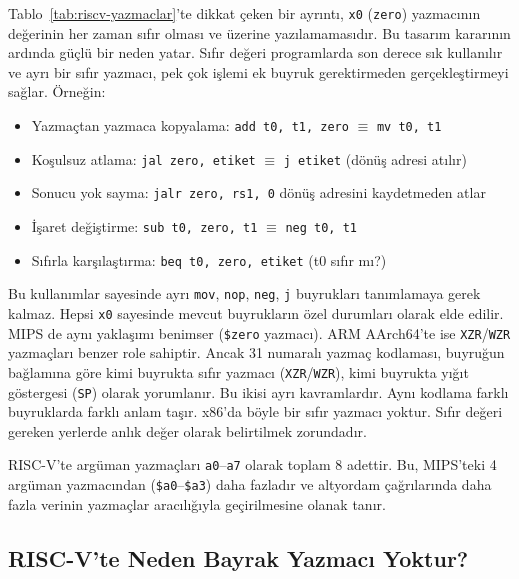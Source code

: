 Tablo~\ref{tab:riscv-yazmaclar}'te dikkat çeken bir ayrıntı, \texttt{x0} (\texttt{zero}) yazmacının değerinin her zaman sıfır olması ve üzerine yazılamamasıdır. Bu tasarım kararının ardında güçlü bir neden yatar. Sıfır değeri programlarda son derece sık kullanılır ve ayrı bir sıfır yazmacı, pek çok işlemi ek buyruk gerektirmeden gerçekleştirmeyi sağlar. Örneğin:

\begin{itemize}[nosep]
\item Yazmaçtan yazmaca kopyalama: \texttt{add t0, t1, zero} $\equiv$ \texttt{mv t0, t1}
\item Koşulsuz atlama: \texttt{jal zero, etiket} $\equiv$ \texttt{j etiket} (dönüş adresi atılır)
\item Sonucu yok sayma: \texttt{jalr zero, rs1, 0} dönüş adresini kaydetmeden atlar
\item İşaret değiştirme: \texttt{sub t0, zero, t1} $\equiv$ \texttt{neg t0, t1}
\item Sıfırla karşılaştırma: \texttt{beq t0, zero, etiket} (t0 sıfır mı?)
\end{itemize}

Bu kullanımlar sayesinde ayrı \texttt{mov}, \texttt{nop}, \texttt{neg}, \texttt{j} buyrukları tanımlamaya gerek kalmaz. Hepsi \texttt{x0} sayesinde mevcut buyrukların özel durumları olarak elde edilir. MIPS de aynı yaklaşımı benimser (\texttt{\$zero} yazmacı). ARM AArch64'te ise \texttt{XZR}/\texttt{WZR} yazmaçları benzer role sahiptir. Ancak 31 numaralı yazmaç kodlaması, buyruğun bağlamına göre kimi buyrukta sıfır yazmacı (\texttt{XZR}/\texttt{WZR}), kimi buyrukta yığıt göstergesi (\texttt{SP}) olarak yorumlanır. Bu ikisi ayrı kavramlardır. Aynı kodlama farklı buyruklarda farklı anlam taşır. x86'da böyle bir sıfır yazmacı yoktur. Sıfır değeri gereken yerlerde anlık değer olarak belirtilmek zorundadır.

RISC-V'te argüman yazmaçları \texttt{a0}--\texttt{a7} olarak toplam 8 adettir. Bu, MIPS'teki 4 argüman yazmacından (\texttt{\$a0}--\texttt{\$a3}) daha fazladır ve altyordam çağrılarında daha fazla verinin yazmaçlar aracılığıyla geçirilmesine olanak tanır.

\subsection{RISC-V'te Neden Bayrak Yazmacı Yoktur?}
\label{subsec:bayrak-yazmaci}

